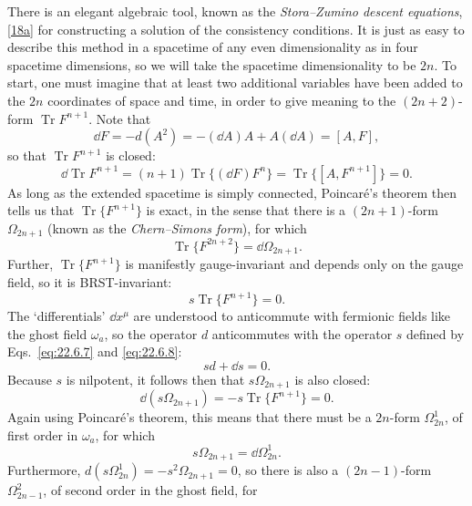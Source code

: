 There is an elegant algebraic tool, known as the
\emph{Stora--Zumino descent equations},\hyperref[ch22-ref-18a]{[18a]} for
constructing a solution of the consistency conditions. It is just as easy
to describe this method in a spacetime of any even dimensionality as in
four spacetime dimensions, so we will take the spacetime dimensionality to
be $2n$. To start, one must imagine that at least two additional variables
have been added to the $2n$ coordinates of space and time, in order to give
meaning to the $(2n+2)$-form $\operatorname{Tr}F^{n+1}$. Note that
\begin{equation}
 \dd F=-d(A^2)=-(\dd A)A+A(\dd A)=[A,F],
 \tag{22.6.22}\label{eq:22.6.22}
\end{equation}
so that $\operatorname{Tr}F^{n+1}$ is closed:
\begin{equation}
 \dd\operatorname{Tr}F^{n+1}
 =(n+1)\operatorname{Tr}\{(\dd F)F^n\}
 =\operatorname{Tr}\{[A,F^{n+1}]\}=0.
 \tag{22.6.23}\label{eq:22.6.23}
\end{equation}
As long as the extended spacetime is simply connected, Poincaré's theorem
then tells us that $\operatorname{Tr}\{F^{n+1}\}$ is exact, in the sense
that there is a $(2n+1)$-form $\Omega_{2n+1}$ (known as the
\emph{Chern--Simons form}), for which
\begin{equation}
 \operatorname{Tr}\{F^{2n+2}\}=\dd\Omega_{2n+1}.
 \tag{22.6.24}\label{eq:22.6.24}
\end{equation}
Further, $\operatorname{Tr}\{F^{n+1}\}$ is manifestly gauge-invariant and
depends only on the gauge field, so it is BRST-invariant:
\begin{equation}
 s\operatorname{Tr}\{F^{n+1}\}=0.
 \tag{22.6.25}\label{eq:22.6.25}
\end{equation}
The `differentials' $\dd x^\mu$ are understood to anticommute with fermionic
fields like the ghost field $\omega_a$, so the operator $d$
anticommutes with the operator $s$ defined by Eqs.~\eqref{eq:22.6.7} and
\eqref{eq:22.6.8}:
\[
 sd+\dd s=0.
\]
Because $s$ is nilpotent, it follows then that $s\Omega_{2n+1}$ is also
closed:
\[
 \dd(s\Omega_{2n+1})=-s\operatorname{Tr}\{F^{n+1}\}=0.
\]
Again using Poincaré's theorem, this means that there must be a $2n$-form
$\Omega^1_{2n}$, of first order in $\omega_a$, for which
\begin{equation}
 s\Omega_{2n+1}=\dd\Omega^1_{2n}.
 \tag{22.6.26}\label{eq:22.6.26}
\end{equation}
Furthermore, $d(s\Omega^1_{2n})=-s^2\Omega_{2n+1}=0$, so there is also a
$(2n-1)$-form $\Omega^2_{2n-1}$, of second order in the ghost field, for
